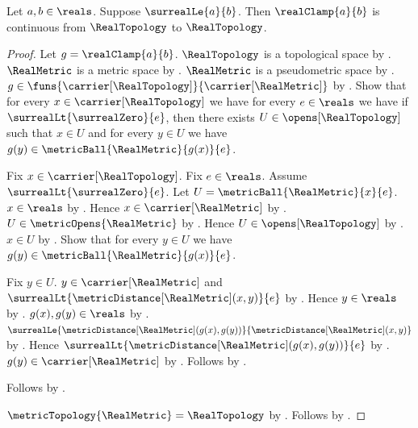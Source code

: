 \begin{theorem}\label{real_clamp_continuous}
    Let $a,b\in\reals$.
    Suppose $\surrealLe{a}{b}$.
    Then $\realClamp{a}{b}$ is continuous from
        $\RealTopology$ to $\RealTopology$.
\end{theorem}
\begin{proof}
    Let $g=\realClamp{a}{b}$.
    $\RealTopology$ is a topological space
        by .
    $\RealMetric$ is a metric space
        by .
    $\RealMetric$ is a pseudometric space by
        .
    $g\in\funs{\carrier[\RealTopology]}{\carrier[\RealMetric]}$
        by
        .
    Show that for every $x\in\carrier[\RealTopology]$ we have
        for every $e\in\reals$ we have if
            $\surrealLt{\surrealZero}{e}$, then there exists
            $U\in\opens[\RealTopology]$ such that $x\in U$ and
            for every $y\in U$ we have
                $g(y)\in\metricBall{\RealMetric}{g(x)}{e}$.
    \begin{subproof}
        Fix $x\in\carrier[\RealTopology]$.
        Fix $e\in\reals$.
        Assume $\surrealLt{\surrealZero}{e}$.
        Let $U=\metricBall{\RealMetric}{x}{e}$.
        $x\in\reals$ by .
        Hence $x\in\carrier[\RealMetric]$
            by .
        $U\in\metricOpens{\RealMetric}$
            by .
        Hence $U\in\opens[\RealTopology]$
            by .
        $x\in U$ by .
        Show that for every $y\in U$ we have
            $g(y)\in\metricBall{\RealMetric}{g(x)}{e}$.
        \begin{subproof}
            Fix $y\in U$.
            $y\in\carrier[\RealMetric]$ and
                $\surrealLt{\metricDistance[\RealMetric](x,y)}{e}$
                by .
            Hence $y\in\reals$ by .
            $g(x),g(y)\in\reals$
                by .
            $\surrealLe{\metricDistance[\RealMetric](g(x),g(y))}
                {\metricDistance[\RealMetric](x,y)}$
                by
                .
            Hence
                $\surrealLt{\metricDistance[\RealMetric](g(x),g(y))}{e}$
                by
                .
            $g(y)\in\carrier[\RealMetric]$
                by .
            Follows by .
        \end{subproof}
        Follows by \auto.
    \end{subproof}
    $\metricTopology{\RealMetric}=\RealTopology$
        by .
    Follows by .
\end{proof}

